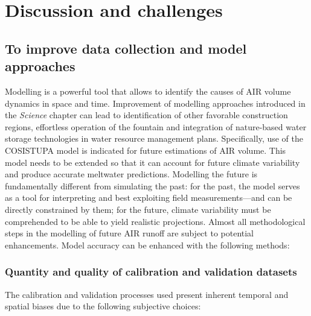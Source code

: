 \section{Discussion and challenges}


\subsection{To improve data collection and model approaches}

Modelling is a powerful tool that allows to identify the causes of AIR volume dynamics in space and time.
Improvement of modelling approaches introduced in the \textit{Science} chapter can lead to identification of
other favorable construction regions, effortless operation of the fountain and integration of nature-based water
storage technologies in water resource management plans. Specifically, use of the COSISTUPA model is indicated
for future estimations of \ac{AIR} volume. This model needs to be extended so that it can account for future
climate variability and produce accurate meltwater predictions. Modelling the future is fundamentally different
from simulating the past: for the past, the model serves as a tool for interpreting and best exploiting field
measurements---and can be directly constrained by them; for the future, climate variability must be comprehended
to be able to yield realistic projections. Almost all methodological steps in the modelling of future \ac{AIR}
runoff are subject to potential enhancements. Model accuracy can be enhanced with the following methods:


\subsubsection{Quantity and quality of calibration and validation datasets}

The calibration and validation processes used present inherent temporal and spatial biases due to the following
subjective choices:

